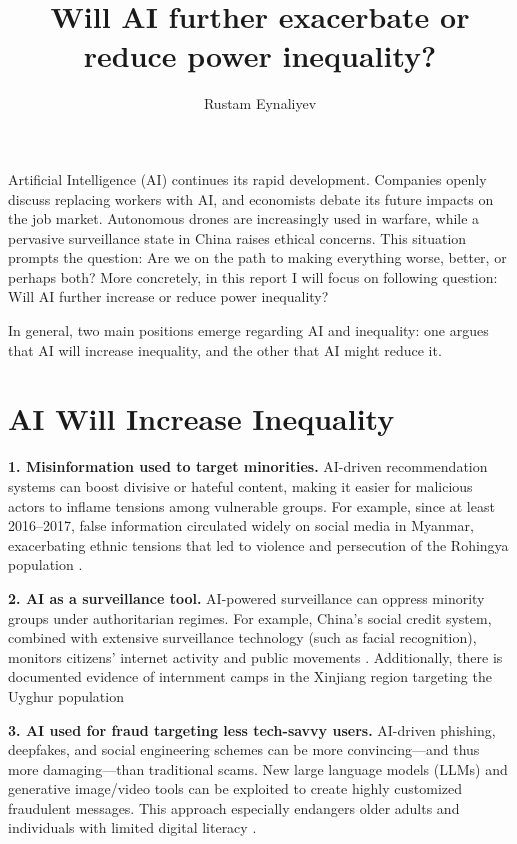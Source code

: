 \documentclass[stu,12pt,floatsintext]{apa7}
\title{Will AI further exacerbate or reduce power inequality?} %
\author{Rustam Eynaliyev}
\affiliation{Vrije Universiteit Amsterdam}
\begin{document}
\maketitle 

Artificial Intelligence (AI) continues its rapid development. Companies openly discuss replacing workers with AI, and economists debate its future impacts on the job market. Autonomous drones are increasingly used in warfare, while a pervasive surveillance state in China raises ethical concerns. This situation prompts the question: Are we on the path to making everything worse, better, or perhaps both?
More concretely, in this report I will focus on following question: Will AI further increase or reduce power inequality?


In general, two main positions emerge regarding AI and inequality: one argues that AI will increase inequality, and the other that AI might reduce it.

\section*{AI Will Increase Inequality}

\noindent \textbf{1. Misinformation used to target minorities.}  
AI-driven recommendation systems can boost divisive or hateful content, making it easier for malicious actors to inflame tensions among vulnerable groups. For example, since at least 2016--2017, false information circulated widely on social media in Myanmar, exacerbating ethnic tensions that led to violence and persecution of the Rohingya population \parencite{Amnesty_Rohingya_2022}. 

\noindent \textbf{2. AI as a surveillance tool.}  
AI-powered surveillance can oppress minority groups under authoritarian regimes. For example, China’s social credit system, combined with extensive surveillance technology (such as facial recognition), monitors citizens’ internet activity and public movements \parencite{BBC_China_Surveillance_2017}. Additionally, there is documented evidence of internment camps in the Xinjiang region targeting the Uyghur population \parencite{}

\noindent \textbf{3. AI used for fraud targeting less tech-savvy users.}  
AI-driven phishing, deepfakes, and social engineering schemes can be more convincing—and thus more damaging—than traditional scams. New large language models (LLMs) and generative image/video tools can be exploited to create highly customized fraudulent messages. This approach especially endangers older adults and individuals with limited digital literacy \parencite{TheConversation_Fraud_Seniors_2023}. 
\end{document}
